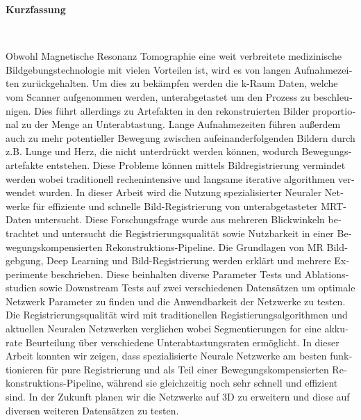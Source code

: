 \newpage
\thispagestyle{empty}
\begin{Huge}
\noindent \textbf{Kurzfassung}
\end{Huge}
\chapterheadstartvskip \\
\begin{otherlanguage}{ngerman}
Obwohl Magnetische Resonanz Tomographie eine weit verbreitete medizinische Bildgebungstechnologie mit vielen Vorteilen ist, wird es von langen Aufnahmezeiten zurückgehalten. Um dies zu bekämpfen werden die k-Raum Daten, welche vom Scanner aufgenommen werden, unterabgetastet um den Prozess zu beschleunigen. Dies führt allerdings zu Artefakten in den rekonstruierten Bilder proportional zu der Menge an Unterabtastung. Lange Aufnahmezeiten führen außerdem auch zu mehr potentieller Bewegung zwischen aufeinanderfolgenden Bildern durch z.B. Lunge und Herz, die nicht unterdrückt werden können, wodurch Bewegungsartefakte entstehen. Diese Probleme können mittels Bildregistrierung vermindet werden wobei traditionell rechenintensive und langsame iterative algorithmen verwendet wurden. In dieser Arbeit wird die Nutzung spezialisierter Neuraler Netwerke für effiziente und schnelle Bild-Registrierung von unterabgetasteter MRT-Daten untersucht. Diese Forschungsfrage wurde aus mehreren Blickwinkeln betrachtet und untersucht die Registrierungsqualität sowie Nutzbarkeit in einer Bewegungskompensierten Rekonstruktions-Pipeline. Die Grundlagen von MR Bildgebgung, Deep Learning und Bild-Registrierung werden erklärt und mehrere Experimente beschrieben. Diese beinhalten diverse Parameter Tests und Ablationsstudien sowie Downstream Tests auf zwei verschiedenen Datensätzen um optimale Netzwerk Parameter zu finden und die Anwendbarkeit der Netzwerke zu testen. Die Registrierungsqualität wird mit traditionellen Registierungsalgorithmen und aktuellen Neuralen Netzwerken verglichen  wobei Segmentierungen for eine akkurate Beurteilung über verschiedene Unterabtastungsraten ermöglicht. In dieser Arbeit konnten wir zeigen, dass spezialisierte Neurale Netzwerke am besten funktionieren für pure Registrierung und als Teil einer Bewegungskompensierten Rekonstruktions-Pipeline, während sie gleichzeitig noch sehr schnell und effizient sind. In der Zukunft planen wir die Netzwerke auf 3D zu erweitern und diese auf diversen weiteren Datensätzen zu testen.
\end{otherlanguage}